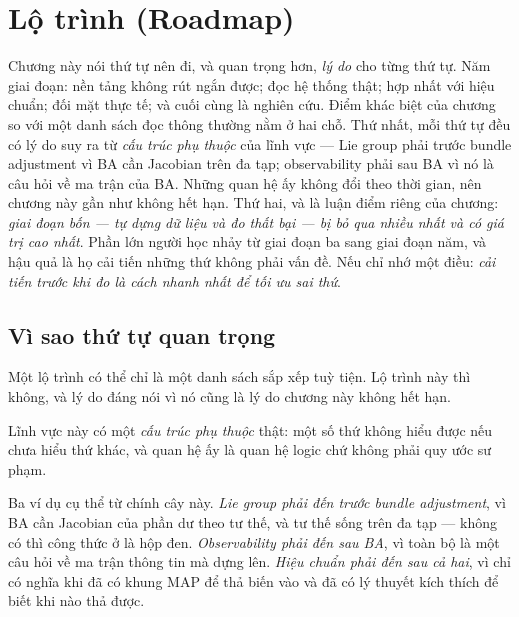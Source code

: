 \documentclass[../../vslam.tex]{subfiles}
\begin{document}
\chapter{Lộ trình (Roadmap)}

\begin{tomtat}
Chương này nói thứ tự nên đi, và quan trọng hơn, \emph{lý do} cho từng thứ tự. Năm giai đoạn: nền tảng không rút ngắn được; đọc hệ thống thật; hợp nhất với hiệu chuẩn; đối mặt thực tế; và cuối cùng là nghiên cứu. Điểm khác biệt của chương so với một danh sách đọc thông thường nằm ở hai chỗ. Thứ nhất, mỗi thứ tự đều có lý do suy ra từ \emph{cấu trúc phụ thuộc} của lĩnh vực --- Lie group phải trước bundle adjustment vì BA cần Jacobian trên đa tạp; observability phải sau BA vì nó là câu hỏi về ma trận của BA. Những quan hệ ấy không đổi theo thời gian, nên chương này gần như không hết hạn. Thứ hai, và là luận điểm riêng của chương: \emph{giai đoạn bốn --- tự dựng dữ liệu và đo thất bại --- bị bỏ qua nhiều nhất và có giá trị cao nhất}. Phần lớn người học nhảy từ giai đoạn ba sang giai đoạn năm, và hậu quả là họ cải tiến những thứ không phải vấn đề. Nếu chỉ nhớ một điều: \emph{cải tiến trước khi đo là cách nhanh nhất để tối ưu sai thứ}.
\end{tomtat}

\section{Vì sao thứ tự quan trọng}

Một lộ trình có thể chỉ là một danh sách sắp xếp tuỳ tiện. Lộ trình này thì không, và lý do đáng nói vì nó cũng là lý do chương này không hết hạn.

Lĩnh vực này có một \emph{cấu trúc phụ thuộc} thật: một số thứ không hiểu được nếu chưa hiểu thứ khác, và quan hệ ấy là quan hệ logic chứ không phải quy ước sư phạm.

Ba ví dụ cụ thể từ chính cây này. \emph{Lie group phải đến trước bundle adjustment}, vì BA cần Jacobian của phần dư theo tư thế, và tư thế sống trên đa tạp --- không có  thì công thức ở  là hộp đen. \emph{Observability phải đến sau BA}, vì toàn bộ  là một câu hỏi về ma trận thông tin mà  dựng lên. \emph{Hiệu chuẩn phải đến sau cả hai}, vì  chỉ có nghĩa khi đã có khung MAP để thả biến vào và đã có lý thuyết kích thích để biết khi nào thả được.
\end{document}
